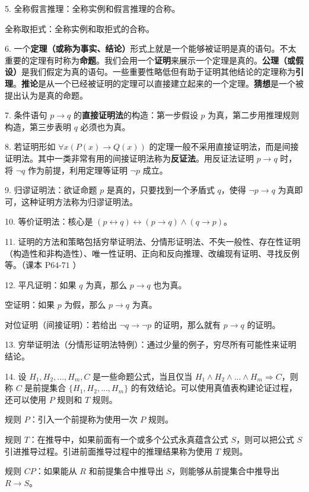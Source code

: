 \documentclass[normal,cyan]{elegantnote}
\begin{document}
    5. 全称假言推理：全称实例和假言推理的合称。

全称取拒式：全称实例和取拒式的合称。

6. 一个\textbf{定理（或称为事实、结论）}形式上就是一个能够被证明是真的语句。不太重要的定理有时称为\textbf{命题}。我们会用一个\textbf{证明}来展示一个定理是真的。\textbf{公理（或假设）}是我们假定为真的语句。一些重要性略低但有助于证明其他结论的定理称为\textbf{引理}。\textbf{推论}是从一个已经被证明的定理可以直接建立起来的一个定理。\textbf{猜想}是一个被提出认为是真的命题。

7. 条件语句 $p\rightarrow q$ 的\textbf{直接证明法}的构造：第一步假设 $p$ 为真，第二步用推理规则构造，第三步表明 $q$ 必须也为真。

8. 若证明形如 $\forall x(P(x)\rightarrow Q(x))$ 的定理一般不采用直接证明法，而是间接证明法。其中一类非常有用的间接证明法称为\textbf{反证法}。用反证法证明 $p\rightarrow q$ 时，将 $\neg q$ 作为前提，利用定理等证明 $\neg p$ 成立。

9. 归谬证明法：欲证命题 $p$ 是真的，只要找到一个矛盾式 $q$，使得 $\neg p\rightarrow q$ 为真即可，这种证明方法称为归谬证明法。

10. 等价证明法：核心是 $(p\leftrightarrow q)\leftrightarrow (p\rightarrow q)\wedge(q\rightarrow p)$。

11. 证明的方法和策略包括穷举证明法、分情形证明法、不失一般性、存在性证明（构造性和非构造性）、唯一性证明、正向和反向推理、改编现有证明、寻找反例等。（课本 $\text{P64-71}$ ）

12. 平凡证明：如果 $q$ 为真，那么 $p\rightarrow q$ 也为真。

空证明：如果 $p$ 为假，那么 $p\rightarrow q$ 为真。

对位证明（间接证明）：若给出 $\neg q\rightarrow\neg p$ 的证明，那么就有 $p\rightarrow q$ 的证明。

13. 穷举证明法（分情形证明法特例）：通过少量的例子，穷尽所有可能性来证明结论。

14. 设 $H_1,H_2,...,H_m,C$ 是一些命题公式，当且仅当 $H_1\wedge H_2\wedge...\wedge H_m\Rightarrow C$，则称 $C$ 是前提集合 $\{H_1,H_2,...,H_m\}$ 的有效结论。可以使用真值表构建论证过程，还可以使用 $P$ 规则和 $T$ 规则。

规则 $P$：引入一个前提称为使用一次 $P$ 规则。

规则 $T$：在推导中，如果前面有一个或多个公式永真蕴含公式 $S$，则可以把公式 $S$ 引进推导过程。引进前面推导过程中的推理结果称为使用 $T$ 规则。

规则 $CP$：如果能从 $R$ 和前提集合中推导出 $S$，则能够从前提集合中推导出 $R\rightarrow S$。
\end{document}

